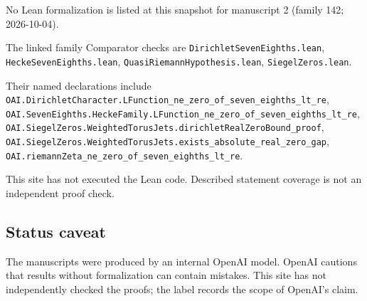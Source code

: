 \documentclass[11pt]{article}
\begin{document}
No Lean formalization is listed at this snapshot for manuscript 2 (family 142; 2026-10-04).

The linked family Comparator checks are \texttt{DirichletSevenEighths.lean}, \texttt{HeckeSevenEighths.lean}, \texttt{QuasiRiemannHypothesis.lean}, \texttt{SiegelZeros.lean}.

Their named declarations include \texttt{OAI.DirichletCharacter.LFunction\_ne\_zero\_of\_seven\_eighths\_lt\_re}, \texttt{OAI.SevenEighths.HeckeFamily.LFunction\_ne\_zero\_of\_seven\_eighths\_lt\_re}, \texttt{OAI.SiegelZeros.WeightedTorusJets.dirichletRealZeroBound\_proof}, \texttt{OAI.SiegelZeros.WeightedTorusJets.exists\_absolute\_real\_zero\_gap}, \texttt{OAI.riemannZeta\_ne\_zero\_of\_seven\_eighths\_lt\_re}.

This site has not executed the Lean code. Described statement coverage is not an independent proof check.

\subsection{Status caveat}
The manuscripts were produced by an internal OpenAI model. OpenAI cautions that results without formalization can contain mistakes. This site has not independently checked the proofs; the label records the scope of OpenAI's claim.
\end{document}
